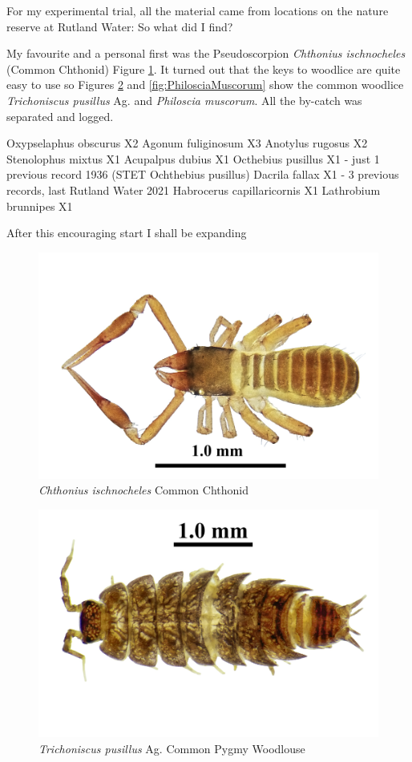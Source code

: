 \documentclass[
]{article}
\begin{document}
For my experimental trial, all the material came from locations on the nature reserve at Rutland Water: So what did I find?

My favourite and a personal first was the Pseudoscorpion \emph{Chthonius ischnocheles} (Common Chthonid) Figure \ref{fig:ChthoniusIschnocheles}. It turned out that the keys to woodlice are quite easy to use so Figures \ref{fig:TrichoniscusPusillus} and \ref{fig:PhilosciaMuscorum} show the common woodlice \textit{Trichoniscus pusillus} Ag. and \textit{Philoscia muscorum}. All the by-catch was separated and logged.

Oxypselaphus obscurus X2
Agonum fuliginosum X3
Anotylus rugosus X2
Stenolophus mixtus X1
Acupalpus dubius X1
Octhebius pusillus X1 - just 1 previous record 1936 (STET Ochthebius pusillus)
Dacrila fallax X1 - 3 previous records, last Rutland Water 2021
Habrocerus capillaricornis X1
Lathrobium brunnipes X1

After this encouraging start I shall be expanding

\begin{figure}

{\centering \includegraphics[width=0.8\linewidth]{images/ChthoniusIschnocheles} 

}

\caption{ \textit{Chthonius ischnocheles} Common Chthonid  }\label{fig:ChthoniusIschnocheles}
\end{figure}

\begin{figure}

{\centering \includegraphics[width=0.8\linewidth]{images/TrichoniscusPusillus} 

}

\caption{  \textit{Trichoniscus pusillus} Ag. Common Pygmy Woodlouse}\label{fig:TrichoniscusPusillus}
\end{figure}
\end{document}
